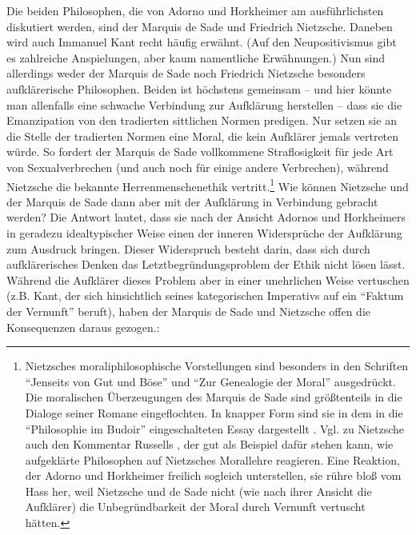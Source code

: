 \documentclass[12pt,a4paper,ngerman]{article}
\begin{document}
Die beiden Philosophen, die von Adorno und Horkheimer am
ausführlichsten diskutiert werden, sind der Marquis de Sade und
Friedrich Nietzsche. Daneben wird auch Immanuel Kant recht häufig
erwähnt. (Auf den Neupositivismus gibt es zahlreiche Anspielungen,
aber kaum namentliche Erwähnungen.) Nun sind allerdings weder der
Marquis de Sade noch Friedrich Nietzsche besonders aufklärerische
Philosophen. Beiden ist höchstens gemeinsam -- und hier könnte man
allenfalls eine schwache Verbindung zur Aufklärung herstellen -- dass
sie die Emanzipation von den tradierten sittlichen Normen predigen.
Nur setzen sie an die Stelle der tradierten Normen eine Moral, die
kein Aufklärer jemals vertreten würde. So fordert der Marquis de Sade
vollkommene Straflosigkeit für jede Art von Sexualverbrechen (und auch
noch für einige andere Verbrechen), während Nietzsche die bekannte
Herrenmenschenethik vertritt.\footnote{Nietzsches moraliphilosophische
  Vorstellungen sind besonders in den Schriften "`Jenseits von Gut und
  Böse"' \cite[z.B. Neuntes Hauptstück, 260.Abschnitt]{nietzsche:1885}
  und "`Zur Genealogie der Moral"' \cite[z.B. Erste Abhandlung,
  5.Abschnitt]{nietzsche:1887} ausgedrückt. Die moralischen
  Überzeugungen des Marquis de Sade sind größtenteils in die Dialoge
  seiner Romane eingeflochten. In knapper Form sind sie in dem in die
  "`Philosophie im Budoir"' eingeschalteten Essay dargestellt
  \cite[S.191-268]{sade:1795}. Vgl. zu Nietzsche auch den Kommentar
  Russells \cite[Kapitel über Nietzsche (3.Buch,
  XXV.Kapitel)]{russell:1946}, der gut als Beispiel dafür stehen kann,
  wie aufgeklärte Philosophen auf Nietzsches Morallehre reagieren.
  Eine Reaktion, der Adorno und Horkheimer freilich sogleich
  unterstellen, sie rühre bloß vom Hass her, weil Nietzsche und de
  Sade nicht (wie nach ihrer Ansicht die Aufklärer) die
  Unbegründbarkeit der Moral durch Vernunft vertuscht hätten.}  Wie
können Nietzsche und der Marquis de Sade dann aber mit der Aufklärung
in Verbindung gebracht werden?  Die Antwort lautet, dass sie nach der
Ansicht Adornos und Horkheimers in geradezu idealtypischer Weise einen
der inneren Widersprüche der Aufklärung zum Ausdruck bringen. Dieser
Widerspruch besteht darin, dass sich durch aufklärerisches Denken das
Letztbegründungsproblem der Ethik nicht lösen lässt. Während die
Aufklärer dieses Problem aber in einer unehrlichen Weise vertuschen
(z.B. Kant, der sich hinsichtlich seines kategorischen Imperativs auf
ein "`Faktum der Vernunft"' beruft), haben der Marquis de Sade und
Nietzsche offen die Konsequenzen daraus gezogen.:
\end{document}
